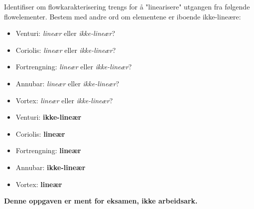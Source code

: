 

Identifiser om flowkarakterisering trengs for å "linearisere" utgangen fra følgende flowelementer. Bestem med andre ord om elementene er iboende ikke-lineære:

\begin{itemize}
\item{} Venturi: {\it lineær} eller {\it ikke-lineær}?
\vskip 5pt
\item{} Coriolis: {\it lineær} eller {\it ikke-lineær}?
\vskip 5pt
\item{} Fortrengning: {\it lineær} eller {\it ikke-lineær}?
\vskip 5pt
\item{} Annubar: {\it lineær} eller {\it ikke-lineær}?
\vskip 5pt
\item{} Vortex: {\it lineær} eller {\it ikke-lineær}?
\end{itemize}







\begin{itemize}
\item{} Venturi: {\bf ikke-lineær}
\vskip 5pt
\item{} Coriolis: {\bf lineær}
\vskip 5pt
\item{} Fortrengning: {\bf lineær}
\vskip 5pt
\item{} Annubar: {\bf ikke-lineær}
\vskip 5pt
\item{} Vortex: {\bf lineær}
\end{itemize}







{\bf Denne oppgaven er ment for eksamen, ikke arbeidsark.}

